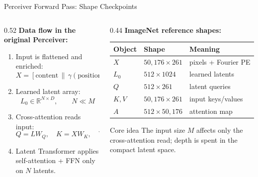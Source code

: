 \documentclass[aspectratio=169,11pt]{beamer}
\begin{document}
\begin{frame}[shrink=5]{Perceiver Forward Pass: Shape Checkpoints}
  \begin{columns}[T]
    \begin{column}{0.52\textwidth}
      \textbf{Data flow in the original Perceiver:}
      \begin{enumerate}
        \item Input is flattened and enriched:
        \[
          X=[\text{content}\,\|\,\gamma(\text{position})]\in\mathbb{R}^{M\times C_{\text{tot}}}
        \]
        \item Learned latent array:
        \[
          L_0\in\mathbb{R}^{N\times D},\qquad N\ll M
        \]
        \item Cross-attention reads input:
        \[
          Q=L W_Q,\quad K=XW_K,\quad V=XW_V
        \]
        \item Latent Transformer applies self-attention + FFN only on $N$ latents.
      \end{enumerate}
    \end{column}
    \begin{column}{0.44\textwidth}
      \textbf{ImageNet reference shapes:}
      \begin{table}
        \centering\scriptsize
        \begin{tabular}{lll}
          \toprule
          \textbf{Object} & \textbf{Shape} & \textbf{Meaning} \\
          \midrule
          $X$ & $50{,}176\times261$ & pixels + Fourier PE \\
          $L_0$ & $512\times1024$ & learned latents \\
          $Q$ & $512\times261$ & latent queries \\
          $K,V$ & $50{,}176\times261$ & input keys/values \\
          $A$ & $512\times50{,}176$ & attention map \\
          \bottomrule
        \end{tabular}
      \end{table}

      \vspace{0.4em}
      \begin{block}{Core idea}
        The input size $M$ affects only the cross-attention read; depth is spent in the compact latent space.
      \end{block}
    \end{column}
  \end{columns}
\end{frame}
\end{document}
